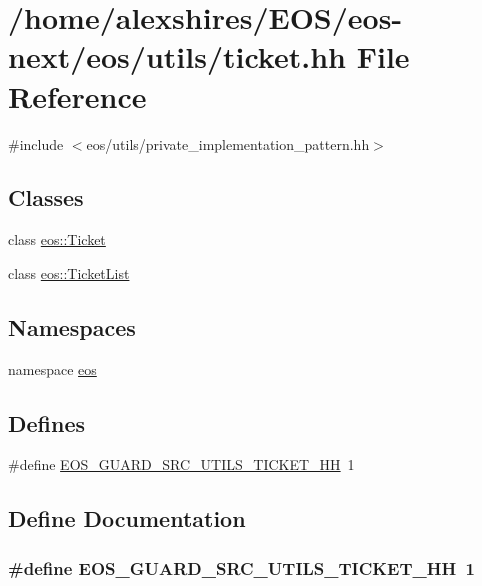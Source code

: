 \hypertarget{ticket_8hh}{
\section{/home/alexshires/EOS/eos-\/next/eos/utils/ticket.hh File Reference}
\label{ticket_8hh}
}
{\ttfamily \#include $<$eos/utils/private\_\-implementation\_\-pattern.hh$>$}\par
\subsection*{Classes}
\begin{DoxyCompactItemize}
\item 
class \hyperlink{classeos_1_1Ticket}{eos::Ticket}
\item 
class \hyperlink{classeos_1_1TicketList}{eos::TicketList}
\end{DoxyCompactItemize}
\subsection*{Namespaces}
\begin{DoxyCompactItemize}
\item 
namespace \hyperlink{namespaceeos}{eos}
\end{DoxyCompactItemize}
\subsection*{Defines}
\begin{DoxyCompactItemize}
\item 
\#define \hyperlink{ticket_8hh_ae4a20995d5678bf54abbf81e82f98a95}{EOS\_\-GUARD\_\-SRC\_\-UTILS\_\-TICKET\_\-HH}~1
\end{DoxyCompactItemize}


\subsection{Define Documentation}
\hypertarget{ticket_8hh_ae4a20995d5678bf54abbf81e82f98a95}{
\subsubsection[{EOS\_\-GUARD\_\-SRC\_\-UTILS\_\-TICKET\_\-HH}]{\setlength{\rightskip}{0pt plus 5cm}\#define EOS\_\-GUARD\_\-SRC\_\-UTILS\_\-TICKET\_\-HH~1}}
\label{ticket_8hh_ae4a20995d5678bf54abbf81e82f98a95}
